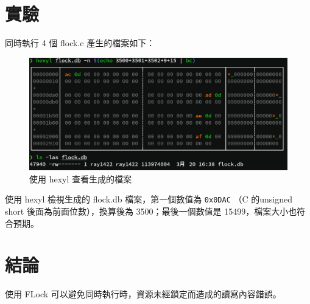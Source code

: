 \documentclass{ctexart}
\begin{document}
\section{實驗}
同時執行 4 個 flock.c 產生的檔案如下：
\begin{figure}
    \centering
    \includegraphics[width=\linewidth]{160649109_731735200844467_3217228969766850594_n.png}
    \caption{使用 hexyl 查看生成的檔案}
    \label{fig:my_label}
\end{figure}
使用 hexyl 檢視生成的 flock.db 檔案，第一個數值為 \texttt{0x0DAC} （C 的unsigned short 後面為前面位數），換算後為 3500；最後一個數值是 15499，檔案大小也符合預期。
\section{結論}
使用 FLock 可以避免同時執行時，資源未經鎖定而造成的讀寫內容錯誤。
\end{document}
